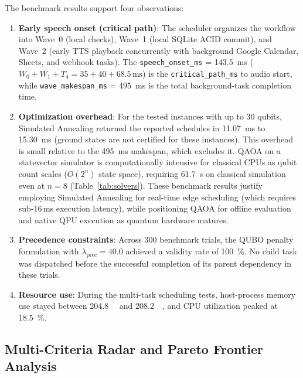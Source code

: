 \documentclass[review,12pt,times,authoryear]{elsarticle}
\theoremstyle{definition}
\begin{document}
The benchmark results support four observations:
\begin{enumerate}[leftmargin=*]
\item \textbf{Early speech onset (critical path)}: The scheduler organizes the workflow into Wave~0 (local checks), Wave~1 (local SQLite ACID commit), and Wave~2 (early TTS playback concurrently with background Google Calendar, Sheets, and webhook tasks). The \texttt{speech\_onset\_ms} = \SI{143.5}{\milli\second} ($W_0 + W_1 + T_4 = 35 + 40 + 68.5\,\text{ms}$) is the \texttt{critical\_path\_ms} to audio start, while \texttt{wave\_makespan\_ms} = \SI{495}{\milli\second} is the total background-task completion time.
\item \textbf{Optimization overhead}: For the tested instances with up to 30 qubits, Simulated Annealing returned the reported schedules in \SI{11.07}{\milli\second} to \SI{15.30}{\milli\second} (ground states are not certified for these instances). This overhead is small relative to the \SI{495}{\milli\second} makespan, which excludes it. QAOA on a statevector simulator is computationally intensive for classical CPUs as qubit count scales ($O(2^n)$ state space), requiring \SI{61.7}{\second} on classical simulation even at $n=8$ (Table~\ref{tab:solvers}). These benchmark results justify employing Simulated Annealing for real-time edge scheduling (which requires sub-16\,ms execution latency), while positioning QAOA for offline evaluation and native QPU execution as quantum hardware matures.
\item \textbf{Precedence constraints}: Across 300 benchmark trials, the QUBO penalty formulation with $\lambda_{\text{prec}}=40.0$ achieved a validity rate of \SI{100}{\percent}. No child task was dispatched before the successful completion of its parent dependency in these trials.
\item \textbf{Resource use}: During the multi-task scheduling tests, host-process memory use stayed between \SI{204.8}{\mega\byte} and \SI{208.2}{\mega\byte}, and CPU utilization peaked at \SI{18.5}{\percent}.
\end{enumerate}

\subsection{Multi-Criteria Radar and Pareto Frontier Analysis}
\end{document}
